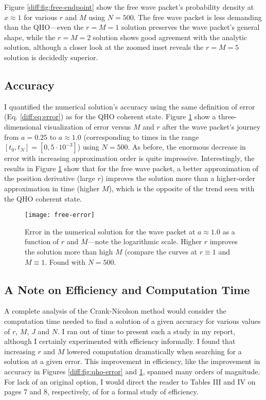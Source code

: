 \documentclass[11pt, a4paper]{article}
\begin{document}
Figure \ref{diff:fig:free-endpoint} show the free wave packet's probability density at $ x \approx 1 $ for various $ r $ and $ M $ using $ N = 500 $. The free wave packet is less demanding than the QHO---even the $ r = M = 1 $ solution preserves the wave packet's general shape, while the $ r = M = 2 $ solution shows good agreement with the analytic solution, although a closer look at the zoomed inset reveals the $ r = M = 5 $ solution is decidedly superior. 


\subsection{Accuracy}
I quantified the numerical solution's accuracy using the same definition of error (Eq. \ref{diff:eq:error}) as for the QHO coherent state. Figure \ref{diff:fig:free-error} show a three-dimensional visualization of error versus $ M $ and $ r $ after the wave packet's journey from $ a = 0.25 $ to $ a \approx 1.0 $ (corresponding to times in the range $ [t_{0}, t_{N}] = [0, 5\cdot 10^{-3}] $) using $ N = 500 $. As before, the enormous decrease in error with increasing approximation order is quite impressive. Interestingly, the results in Figure \ref{diff:fig:free-error} show that for the free wave packet, a better approximation of the position derivative (large $ r $) improves the solution more than a higher-order approximation in time (higher $ M $), which is the opposite of the trend seen with the QHO coherent state.

\begin{figure}[H]
\centering
\texttt{[image: free-error]}
\caption{Error in the numerical solution for the wave packet at $ a \approx 1.0 $ as a function of $ r $ and $ M $---note the logarithmic scale. Higher $ r $ improves the solution more than high $ M $ (compare the curves at $ r \equiv 1$ and $ M \equiv 1 $. Found with $ N = 500 $.}
\label{diff:fig:free-error}
\end{figure}


\subsection{A Note on Efficiency and Computation Time}
A complete analysis of the Crank-Nicolson method would consider the computation time needed to find a solution of a given accuracy for various values of $ r $, $ M $, $ J $ and $ N $. I ran out of time to present such a study in my report, although I certainly experimented with efficiency informally. I found that increasing $ r $ and $ M $ lowered computation dramatically when searching for a solution at a given error. This improvement in efficiency, like the improvement in accuracy in Figures \ref{diff:fig:qho-error} and \ref{diff:fig:free-error}, spanned many orders of magnitude. For lack of an original option, I would direct the reader to Tables III and IV on pages 7 and 8, respectively, of \cite{vandijk} for a formal study of efficiency.
\end{document}
